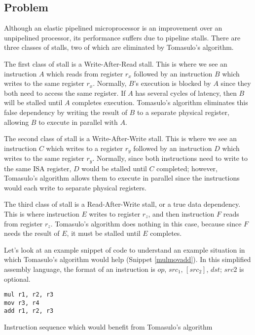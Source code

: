 \documentclass[12pt]{article}
\begin{document}
\subsection{Problem}
Although an elastic pipelined microprocessor is an improvement over an unpipelined processor, its performance suffers due to pipeline stalls.
There are three classes of stalls, two of which are eliminated by Tomasulo's algorithm.

The first class of stall is a Write-After-Read stall. This is where we see an instruction $A$ which reads from register $r_x$ followed by an instruction
$B$ which writes to the same register $r_x$. Normally, $B$'s execution is blocked by $A$ since they both need to access the same register. If $A$ has
several cycles of latency, then $B$ will be stalled until $A$ completes execution. Tomasulo's algorithm eliminates this false dependency by writing the
result of $B$ to a separate physical register, allowing $B$ to execute in parallel with $A$.

The second class of stall is a Write-After-Write stall. This is where we see an instruction $C$ which writes to a register $r_y$ followed by an instruction
$D$ which writes to the same register $r_y$. Normally, since both instructions need to write to the same ISA register, $D$ would be stalled until $C$ completed;
however, Tomasulo's algorithm allows them to execute in parallel since the instructions would each write to separate physical registers.

The third class of stall is a Read-After-Write stall, or a true data dependency. This is where instruction $E$ writes to register $r_z$, and then instruction $F$
reads from register $r_z$. Tomasulo's algorithm does nothing in this case, because since $F$ needs the result of $E$, it must be stalled until $E$ completes.

Let's look at an example snippet of code to understand an example situation in which Tomasulo's algorithm would help (Snippet \ref{mulmovadd}).
In this simplified assembly language, the format of an instruction is $op$, $src_1$, $\left[src_2\right]$, $dst$; $src2$ is optional.

\begin{snippet}
\begin{verbatim}
mul r1, r2, r3
mov r3, r4
add r1, r2, r3
\end{verbatim}
\caption{Instruction sequence which would benefit from Tomasulo's algorithm}
\label{mulmovadd}
\end{snippet}
\end{document}
